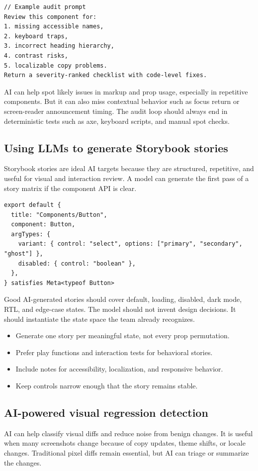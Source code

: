 \begin{verbatim}
// Example audit prompt
Review this component for:
1. missing accessible names,
2. keyboard traps,
3. incorrect heading hierarchy,
4. contrast risks,
5. localizable copy problems.
Return a severity-ranked checklist with code-level fixes.
\end{verbatim}

AI can help spot likely issues in markup and prop usage, especially in repetitive components. But it can also miss contextual behavior such as focus return or screen-reader announcement timing. The audit loop should always end in deterministic tests such as axe, keyboard scripts, and manual spot checks.

\subsection{Using LLMs to generate Storybook stories}
Storybook stories are ideal AI targets because they are structured, repetitive, and useful for visual and interaction review. A model can generate the first pass of a story matrix if the component API is clear.

\begin{verbatim}
export default {
  title: "Components/Button",
  component: Button,
  argTypes: {
    variant: { control: "select", options: ["primary", "secondary", "ghost"] },
    disabled: { control: "boolean" },
  },
} satisfies Meta<typeof Button>
\end{verbatim}

Good AI-generated stories should cover default, loading, disabled, dark mode, RTL, and edge-case states. The model should not invent design decisions. It should instantiate the state space the team already recognizes.

\begin{itemize}[leftmargin=*, itemsep=0.35em]
  \item Generate one story per meaningful state, not every prop permutation.
  \item Prefer play functions and interaction tests for behavioral stories.
  \item Include notes for accessibility, localization, and responsive behavior.
  \item Keep controls narrow enough that the story remains stable.
\end{itemize}

\subsection{AI-powered visual regression detection}
AI can help classify visual diffs and reduce noise from benign changes. It is useful when many screenshots change because of copy updates, theme shifts, or locale changes. Traditional pixel diffs remain essential, but AI can triage or summarize the changes.

